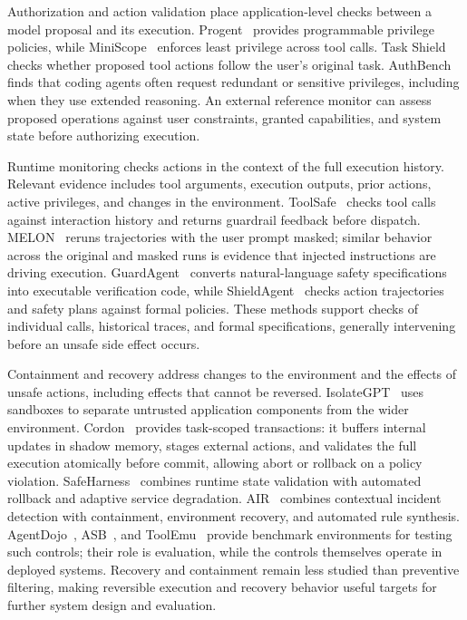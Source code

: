 \documentclass[review]{fcs}
\let\fcsOriginalCite\cite
\renewcommand{\cite}[1]{\allowbreak\fcsOriginalCite{#1}}
\begin{document}
Authorization and action validation place application-level checks between a model proposal and its execution. Progent~\cite{shi2025progent} provides programmable privilege policies, while MiniScope~\cite{zhu2025miniscope} enforces least privilege across tool calls. Task Shield~\cite{jia2025taskshield} checks whether proposed tool actions follow the user's original task. AuthBench~\cite{do2026leastprivilege} finds that coding agents often request redundant or sensitive privileges, including when they use extended reasoning. An external reference monitor can assess proposed operations against user constraints, granted capabilities, and system state before authorizing execution.

Runtime monitoring checks actions in the context of the full execution history. Relevant evidence includes tool arguments, execution outputs, prior actions, active privileges, and changes in the environment. ToolSafe~\cite{mou2026toolsafe} checks tool calls against interaction history and returns guardrail feedback before dispatch. MELON~\cite{pmlr-v267-zhu25z} reruns trajectories with the user prompt masked; similar behavior across the original and masked runs is evidence that injected instructions are driving execution. GuardAgent~\cite{pmlr-v267-xiang25a} converts natural-language safety specifications into executable verification code, while ShieldAgent~\cite{pmlr-v267-chen25ae} checks action trajectories and safety plans against formal policies. These methods support checks of individual calls, historical traces, and formal specifications, generally intervening before an unsafe side effect occurs.

Containment and recovery address changes to the environment and the effects of unsafe actions, including effects that cannot be reversed. IsolateGPT~\cite{wu2025isolategpt} uses sandboxes to separate untrusted application components from the wider environment. Cordon~\cite{chen2026cordon} provides task-scoped transactions: it buffers internal updates in shadow memory, stages external actions, and validates the full execution atomically before commit, allowing abort or rollback on a policy violation. SafeHarness~\cite{lin2026safeharness} combines runtime state validation with automated rollback and adaptive service degradation. AIR~\cite{xiao2026air} combines contextual incident detection with containment, environment recovery, and automated rule synthesis. AgentDojo~\cite{debenedetti2024agentdojo}, ASB~\cite{zhang2025asb}, and ToolEmu~\cite{ruan2024toolemu} provide benchmark environments for testing such controls; their role is evaluation, while the controls themselves operate in deployed systems. Recovery and containment remain less studied than preventive filtering, making reversible execution and recovery behavior useful targets for further system design and evaluation.
\end{document}
